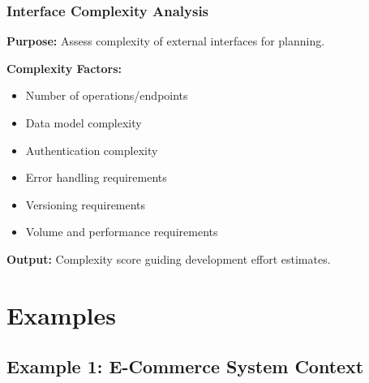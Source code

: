 \documentclass[11pt,letterpaper]{article}
\begin{document}
\subsubsection{Interface Complexity Analysis}

\begin{definitionbox}
\textbf{Purpose:} Assess complexity of external interfaces for planning.

\textbf{Complexity Factors:}
\begin{itemize}[nosep]
    \item Number of operations/endpoints
    \item Data model complexity
    \item Authentication complexity
    \item Error handling requirements
    \item Versioning requirements
    \item Volume and performance requirements
\end{itemize}

\textbf{Output:} Complexity score guiding development effort estimates.
\end{definitionbox}

\section{Examples}

\subsection{Example 1: E-Commerce System Context}
\end{document}
